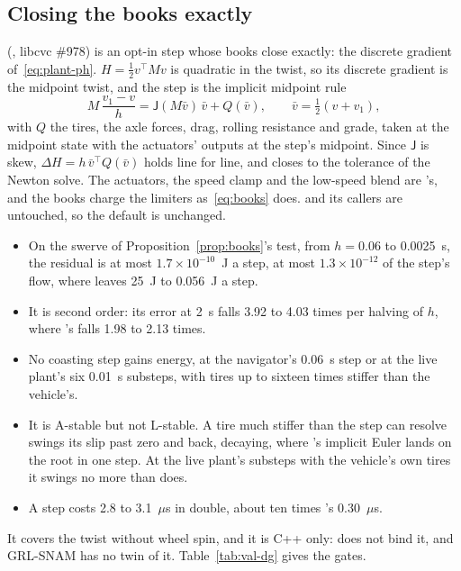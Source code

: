 \documentclass[11pt]{article}
\theoremstyle{remark}
\newcommand{\J}{\mathsf J}
\newcommand{\T}{^{\top}}
\begin{document}
\subsection{Closing the books exactly}
\label{sec:dg}
 (, libcvc \#978) is an opt-in
step whose books close exactly: the discrete gradient of~\eqref{eq:plant-ph}. $H=\tfrac12v\T Mv$
is quadratic in the twist, so its discrete gradient is the midpoint twist, and the step is the
implicit midpoint rule
\begin{equation}
  M\,\frac{v_1-v}{h}=\J(M\bar v)\,\bar v+Q(\bar v),\qquad \bar v=\tfrac12(v+v_1),
  \label{eq:dg}
\end{equation}
with $Q$ the tires, the axle forces, drag, rolling resistance and grade, taken at the midpoint
state with the actuators' outputs at the step's midpoint. Since $\J$ is skew,
$\Delta H=h\,\bar v\T Q(\bar v)$ holds line for line, and  closes to
the tolerance of the Newton solve. The actuators, the speed clamp and the low-speed blend are
's, and the books charge the limiters as~\eqref{eq:books} does. 
and its callers are untouched, so the default is unchanged.
\begin{itemize}
  \item On the swerve of Proposition~\ref{prop:books}'s test, from $h=0.06$ to 0.0025~s, the
        residual is at most $1.7\times10^{-10}$~J a step, at most $1.3\times10^{-12}$ of the
        step's flow, where  leaves 25~J to 0.056~J a step.
  \item It is second order: its error at 2~s falls 3.92 to 4.03 times per halving of $h$, where
        's falls 1.98 to 2.13 times.
  \item No coasting step gains energy, at the navigator's 0.06~s step or at the live plant's six
        0.01~s substeps, with tires up to sixteen times stiffer than the vehicle's.
  \item It is A-stable but not L-stable. A tire much stiffer than the step can resolve swings its
        slip past zero and back, decaying, where 's implicit Euler lands on the
        root in one step. At the live plant's substeps with the vehicle's own tires it swings no
        more than  does.
  \item A step costs 2.8 to 3.1~$\mu$s in double, about ten times 's 0.30~$\mu$s.
\end{itemize}
It covers the twist without wheel spin, and it is C++ only:  does not bind it, and
GRL-SNAM has no twin of it. Table~\ref{tab:val-dg} gives the gates.
\end{document}
